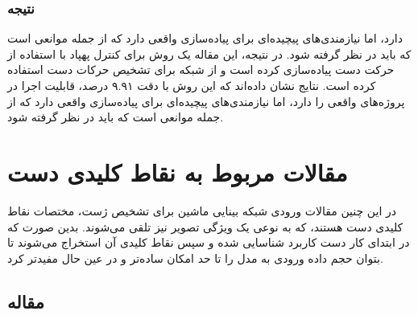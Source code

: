 \subsubsection{نتیجه}
دارد، اما نیازمندی‌های پیچیده‌ای برای پیاده‌سازی واقعی دارد که از جمله موانعی است که باید در نظر گرفته شود.
در نتیجه، این مقاله یک روش برای کنترل پهپاد با استفاده از حرکت دست پیاده‌سازی کرده است و از شبکه 
برای تشخیص حرکات دست استفاده کرده است. نتایج نشان داده‌اند که این روش با دقت ۹.۹۱ درصد، قابلیت اجرا در پروژه‌های واقعی را دارد، اما نیازمندی‌های پیچیده‌ای برای پیاده‌سازی واقعی دارد که از جمله موانعی است که باید در نظر گرفته شود.
\cite{perera2018uav}




\section{مقالات مربوط به نقاط کلیدی دست}
در این چنین مقالات ورودی شبکه بینایی ماشین برای تشخیص ژست، مختصات نقاط کلیدی دست هستند، که به نوعی یک ویژگی تصویر نیز تلقی می‌شوند. بدین صورت که در ابتدای کار دست کاربرد شناسایی شده و سپس نقاط کلیدی آن استخراج می‌شوند تا بتوان حجم داده ورودی به مدل را تا حد امکان ساده‌تر و در عین حال مفیدتر کرد.

\subsection{مقاله }


\cite{murugeswari2014hand}


